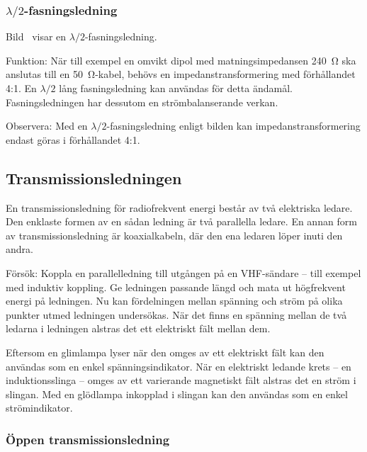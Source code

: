 \subsubsection{$\lambda/2$-fasningsledning}


Bild~ visar en $\lambda/2$-fasningsledning.

Funktion: När till exempel en omvikt dipol med matningsimpedansen \qty{240}{\ohm}
ska anslutas till en \qty{50}{\ohm}-kabel, behövs en impedanstransformering med
förhållandet 4:1.
En \(\lambda/2\) lång fasningsledning kan användas för detta ändamål.
Fasningsledningen har dessutom en strömbalanserande verkan.

Observera: Med en \(\lambda/2\)-fasningsledning enligt bilden kan
impedanstransformering endast göras i förhållandet 4:1.

\subsection{Transmissionsledningen}

En transmissionsledning för radiofrekvent energi består av två elektriska
ledare.
Den enklaste formen av en sådan ledning är två parallella ledare.
En annan form av transmissionsledning är koaxialkabeln, där den ena ledaren
löper inuti den andra.

Försök: Koppla en parallelledning till utgången på en VHF-sändare --
till exempel med induktiv koppling.
Ge ledningen passande längd och mata ut högfrekvent energi på ledningen.
Nu kan fördelningen mellan spänning och ström på olika punkter utmed ledningen
undersökas.
När det finns en spänning mellan de två ledarna i ledningen alstras det ett
elektriskt fält mellan dem.

Eftersom en glimlampa lyser när den omges av ett elektriskt fält kan den
användas som en enkel spänningsindikator.
När en elektriskt ledande krets -- en induktionsslinga -- omges av ett
varierande magnetiskt fält alstras det en ström i slingan.
Med en glödlampa inkopplad i slingan kan den användas som en enkel
strömindikator.

\subsubsection{Öppen transmissionsledning}

